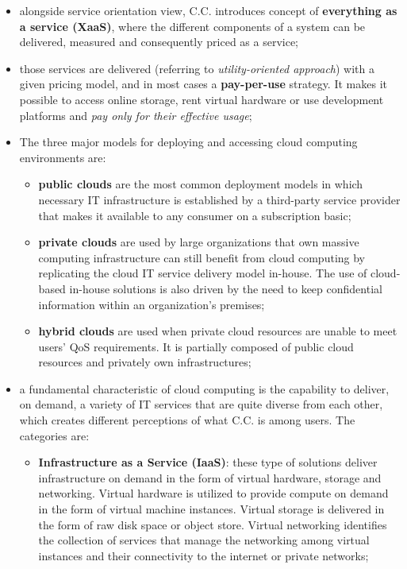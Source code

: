 \documentclass[oneside]{article}
\begin{document}
\begin{itemize}
    \item alongside service orientation view, C.C. introduces concept of \textbf{everything as a service (XaaS)}, where the different components of a system can be delivered, measured and consequently priced as a service;
    
    \item those services are delivered (referring to \textit{utility-oriented approach}) with a given pricing model, and in most cases a \textbf{pay-per-use} strategy. It makes it possible to access online storage, rent virtual hardware or use development platforms and \textit{pay only for their effective usage};
    
    \item The three major models for deploying and accessing cloud computing environments are:
    \begin{itemize}
        \item \textbf{public clouds} are the most common deployment models in which necessary IT infrastructure is established by a third-party service provider that makes it available to any consumer on a subscription basic;
        
        \item \textbf{private clouds} are used by large organizations that own massive computing infrastructure can still benefit from cloud computing by replicating the cloud IT service delivery model in-house. The use of cloud-based in-house solutions is also driven by the need to keep confidential information within an organization's premises;
        
        \item \textbf{hybrid clouds} are used when private cloud resources are unable to meet users' QoS requirements. It is partially composed of public cloud resources and privately own infrastructures;
    \end{itemize}
    
    \item a fundamental characteristic of cloud computing is the capability to deliver, on demand, a variety of IT services that are quite diverse from each other, which creates different perceptions of what C.C. is among users. The categories are:
    \begin{itemize}
        \item \textbf{Infrastructure as a Service (IaaS)}: these type of solutions deliver infrastructure on demand in the form of virtual hardware, storage and networking. Virtual hardware is utilized to provide compute on demand in the form of virtual machine instances. Virtual storage is delivered in the form of raw disk space or object store. Virtual networking identifies the collection of services that manage the networking among virtual instances and their connectivity to the internet or private networks;
        

\end{itemize}
\end{itemize}
\end{document}
